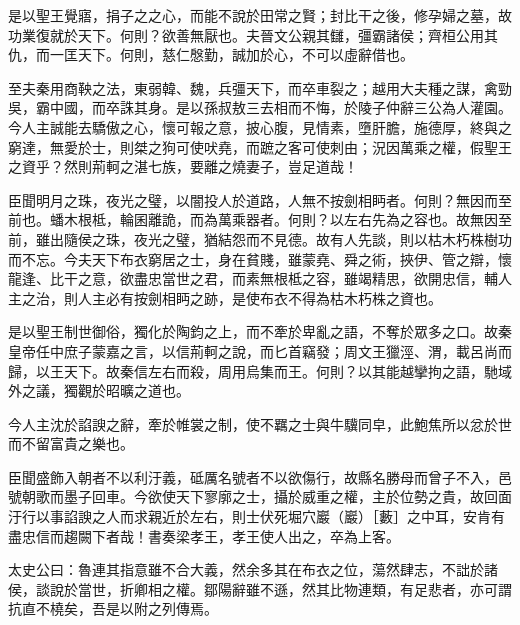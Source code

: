\begin{pinyinscope}
是以聖王覺寤，捐子之之心，而能不說於田常之賢；封比干之後，修孕婦之墓，故功業復就於天下。何則？欲善無厭也。夫晉文公親其讎，彊霸諸侯；齊桓公用其仇，而一匡天下。何則，慈仁慇勤，誠加於心，不可以虛辭借也。

至夫秦用商鞅之法，東弱韓、魏，兵彊天下，而卒車裂之；越用大夫種之謀，禽勁吳，霸中國，而卒誅其身。是以孫叔敖三去相而不悔，於陵子仲辭三公為人灌園。今人主誠能去驕傲之心，懷可報之意，披心腹，見情素，墮肝膽，施德厚，終與之窮達，無愛於士，則桀之狗可使吠堯，而蹠之客可使刺由；況因萬乘之權，假聖王之資乎？然則荊軻之湛七族，要離之燒妻子，豈足道哉！

臣聞明月之珠，夜光之璧，以闇投人於道路，人無不按劍相眄者。何則？無因而至前也。蟠木根柢，輪囷離詭，而為萬乘器者。何則？以左右先為之容也。故無因至前，雖出隨侯之珠，夜光之璧，猶結怨而不見德。故有人先談，則以枯木朽株樹功而不忘。今夫天下布衣窮居之士，身在貧賤，雖蒙堯、舜之術，挾伊、管之辯，懷龍逢、比干之意，欲盡忠當世之君，而素無根柢之容，雖竭精思，欲開忠信，輔人主之治，則人主必有按劍相眄之跡，是使布衣不得為枯木朽株之資也。

是以聖王制世御俗，獨化於陶鈞之上，而不牽於卑亂之語，不奪於眾多之口。故秦皇帝任中庶子蒙嘉之言，以信荊軻之說，而匕首竊發；周文王獵涇、渭，載呂尚而歸，以王天下。故秦信左右而殺，周用烏集而王。何則？以其能越攣拘之語，馳域外之議，獨觀於昭曠之道也。

今人主沈於諂諛之辭，牽於帷裳之制，使不羈之士與牛驥同皁，此鮑焦所以忿於世而不留富貴之樂也。

臣聞盛飾入朝者不以利汙義，砥厲名號者不以欲傷行，故縣名勝母而曾子不入，邑號朝歌而墨子回車。今欲使天下寥廓之士，攝於威重之權，主於位勢之貴，故回面汙行以事諂諛之人而求親近於左右，則士伏死堀穴巖（巖）［藪］之中耳，安肯有盡忠信而趨闕下者哉！書奏梁孝王，孝王使人出之，卒為上客。

太史公曰：魯連其指意雖不合大義，然余多其在布衣之位，蕩然肆志，不詘於諸侯，談說於當世，折卿相之權。鄒陽辭雖不遜，然其比物連類，有足悲者，亦可謂抗直不橈矣，吾是以附之列傳焉。


\end{pinyinscope}
